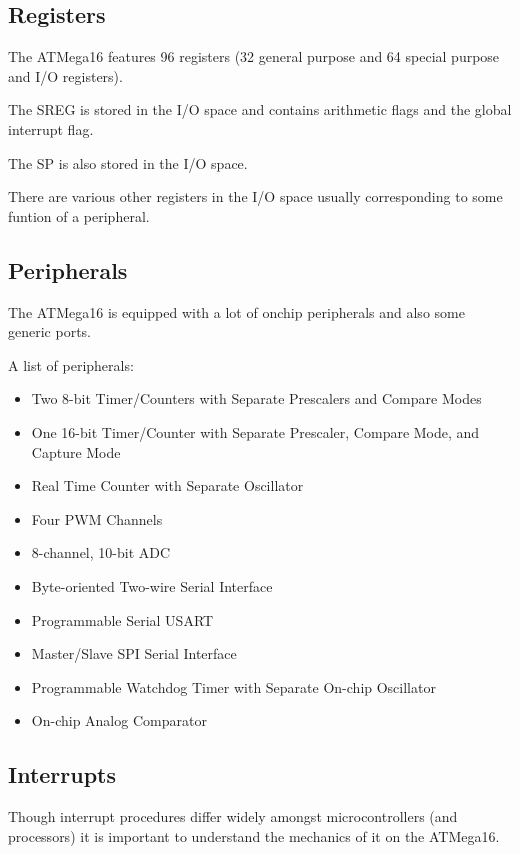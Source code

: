 \subsection{Registers}

The ATMega16 features 96 registers (32 general purpose and 64 special 
purpose and I/O registers).

The \ac{SREG} is stored in the I/O space and contains arithmetic flags
and the global interrupt flag.

The \ac{SP} is also stored in the I/O space.

There are various other registers in the I/O space usually corresponding
to some funtion of a peripheral. \cite[p.331]{ATMegaDS}

\subsection{Peripherals}

The ATMega16 is equipped with a lot of onchip peripherals and also some
generic ports.

A list of peripherals\cite[p.1]{ATMegaDS}:
\begin{itemize}
\item{Two 8-bit Timer/Counters with Separate Prescalers and Compare Modes} 
\item{One 16-bit Timer/Counter with Separate Prescaler, Compare Mode, and Capture Mode}
\item{Real Time Counter with Separate Oscillator}
\item{Four PWM Channels}
\item{8-channel, 10-bit ADC}
\item{Byte-oriented Two-wire Serial Interface}
\item{Programmable Serial USART}
\item{Master/Slave SPI Serial Interface}
\item{Programmable Watchdog Timer with Separate On-chip Oscillator}
\item{On-chip Analog Comparator}
\end{itemize}

\subsection{Interrupts}

Though interrupt procedures differ widely amongst microcontrollers (and processors)
it is important to understand the mechanics of it on the ATMega16. 

